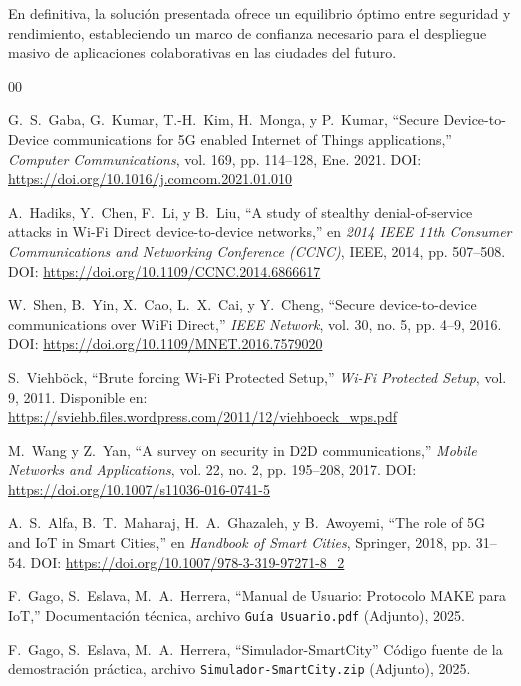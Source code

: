 \documentclass[conference,a4paper,onecolumn,11pt]{IEEEtran} %
\begin{document}
En definitiva, la solución presentada ofrece un equilibrio óptimo entre seguridad y rendimiento, estableciendo un marco de confianza necesario para el despliegue masivo de aplicaciones colaborativas en las ciudades del futuro.
\begin{thebibliography}{00}

G.~S.~Gaba, G.~Kumar, T.-H.~Kim, H.~Monga, y P.~Kumar, ``Secure Device-to-Device communications for 5G enabled Internet of Things applications,'' \emph{Computer Communications}, vol. 169, pp. 114--128, Ene. 2021. DOI: \url{https://doi.org/10.1016/j.comcom.2021.01.010}

A.~Hadiks, Y.~Chen, F.~Li, y B.~Liu, ``A study of stealthy denial-of-service attacks in Wi-Fi Direct device-to-device networks,'' en \emph{2014 IEEE 11th Consumer Communications and Networking Conference (CCNC)}, IEEE, 2014, pp. 507--508. DOI: \url{https://doi.org/10.1109/CCNC.2014.6866617}

W.~Shen, B.~Yin, X.~Cao, L.~X.~Cai, y Y.~Cheng, ``Secure device-to-device communications over WiFi Direct,'' \emph{IEEE Network}, vol. 30, no. 5, pp. 4--9, 2016. DOI: \url{https://doi.org/10.1109/MNET.2016.7579020}

S.~Viehböck, ``Brute forcing Wi-Fi Protected Setup,'' \emph{Wi-Fi Protected Setup}, vol. 9, 2011. Disponible en: \url{https://sviehb.files.wordpress.com/2011/12/viehboeck_wps.pdf}

M.~Wang y Z.~Yan, ``A survey on security in D2D communications,'' \emph{Mobile Networks and Applications}, vol. 22, no. 2, pp. 195--208, 2017. DOI: \url{https://doi.org/10.1007/s11036-016-0741-5}

A.~S.~Alfa, B.~T.~Maharaj, H.~A.~Ghazaleh, y B.~Awoyemi, ``The role of 5G and IoT in Smart Cities,'' en \emph{Handbook of Smart Cities}, Springer, 2018, pp. 31--54. DOI: \url{https://doi.org/10.1007/978-3-319-97271-8_2}

F.~Gago, S.~Eslava, M.~A.~Herrera, ``Manual de Usuario: Protocolo MAKE para IoT,'' Documentación técnica, archivo \texttt{Guía Usuario.pdf} (Adjunto), 2025.

F.~Gago, S.~Eslava, M.~A.~Herrera, ``Simulador-SmartCity'' Código fuente de la demostración práctica, archivo \texttt{Simulador-SmartCity.zip} (Adjunto), 2025.

\end{thebibliography}
\end{document}
